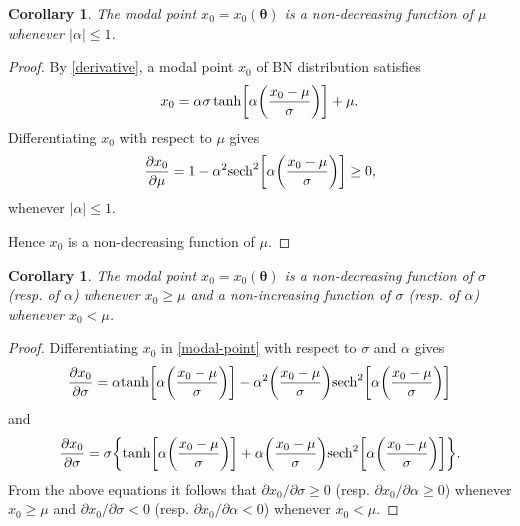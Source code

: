 \documentclass[12pt]{article}
\newtheorem{corollary}[theorem]{Corollary}
\theoremstyle{definition}
\begin{document}
\begin{corollary}
The modal point $x_0=x_0(\boldsymbol{\theta})$ is a non-decreasing function of $\mu$ whenever $\vert\alpha\vert \leq 1$.
\end{corollary}
\begin{proof}
By \eqref{derivative}, a modal point $x_0$ of BN distribution satisfies
\begin{align}\label{modal-point}
x_0=\alpha\sigma \tanh\biggl[\alpha\biggl({x_0-\mu\over\sigma}\biggr)\biggr]+\mu.
\end{align}
Differentiating $x_0$ with respect to $\mu$ gives
\begin{align*}
	{\partial x_0\over\partial\mu}
	=
	1-\alpha^2{\rm sech}^2\biggl[\alpha\biggl({x_0-\mu\over\sigma}\biggr)\biggr]\geq 0,
\end{align*}
whenever $\vert\alpha\vert \leq 1$.

Hence $x_0$ is a non-decreasing function of $\mu$.
\end{proof}

\begin{corollary}
The modal point $x_0=x_0(\boldsymbol{\theta})$ is a non-decreasing function of $\sigma$ (resp. of $\alpha$) whenever $x_0 \geq \mu$ and a non-increasing function  of $\sigma$ (resp. of $\alpha$) whenever $x_0< \mu$.
\end{corollary}
\begin{proof}
Differentiating $x_0$ in \eqref{modal-point} with respect to $\sigma$ and $\alpha$ gives
\begin{align*}
{\partial x_0\over\partial\sigma}
=
\alpha
{\rm tanh}\biggl[\alpha\biggl({x_0-\mu\over\sigma}\biggr)\biggr]
-
\alpha^2\biggl({x_0-\mu\over\sigma}\biggr)
{\rm sech}^2\biggl[\alpha\biggl({x_0-\mu\over\sigma}\biggr)\biggr]
\end{align*}
and
\begin{align*}
{\partial x_0\over\partial\sigma}
=
\sigma\biggl\{
{\rm tanh}\biggl[\alpha\biggl({x_0-\mu\over\sigma}\biggr)\biggr]
+
\alpha\biggl({x_0-\mu\over\sigma}\biggr)
{\rm sech}^2\biggl[\alpha\biggl({x_0-\mu\over\sigma}\biggr)\biggr]
\biggr\}.
\end{align*}
From the above equations it follows that ${\partial x_0/\partial\sigma}\geq 0$ (resp. ${\partial x_0/\partial\alpha}\geq 0$) whenever $x_0 \geq \mu$ and ${\partial x_0/\partial\sigma}< 0$ (resp. ${\partial x_0/\partial\alpha}< 0$) whenever $x_0< \mu$.
\end{proof}
\end{document}
